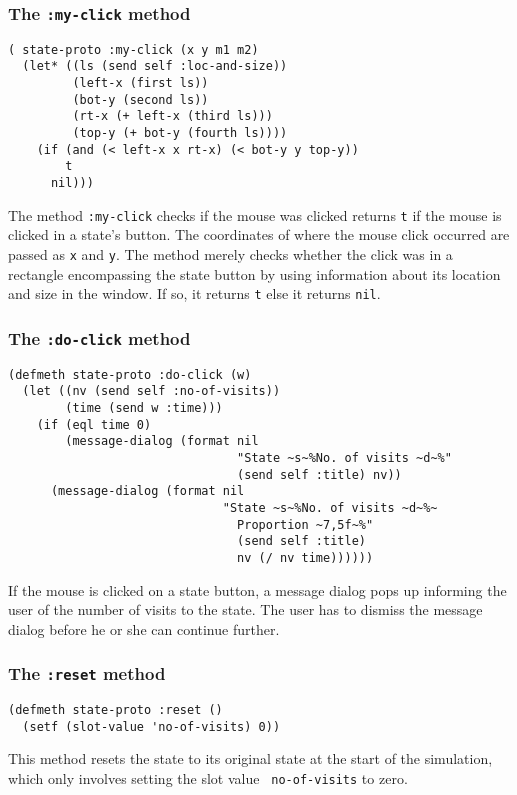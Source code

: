 \subsubsection{The {\tt :my-click} method}
\label{subsubsec:my-click}
\begin{verbatim}
( state-proto :my-click (x y m1 m2)
  (let* ((ls (send self :loc-and-size))
         (left-x (first ls))
         (bot-y (second ls))
         (rt-x (+ left-x (third ls)))
         (top-y (+ bot-y (fourth ls))))
    (if (and (< left-x x rt-x) (< bot-y y top-y))
        t
      nil)))
\end{verbatim}
The method {\tt :my-click} checks if the mouse was clicked returns
{\tt t} if the mouse is clicked in a state's button.  The coordinates
of where the mouse click occurred are passed as {\tt x} and {\tt y}.
The method merely checks whether the click was in a rectangle
encompassing the state button by using information about its location
and size in the window.  If so, it returns {\tt t} else it returns
{\tt nil}. 


\subsubsection{The {\tt :do-click} method}
\label{subsubsec:states-do-click}
\begin{verbatim}
(defmeth state-proto :do-click (w)
  (let ((nv (send self :no-of-visits))
        (time (send w :time)))
    (if (eql time 0)
        (message-dialog (format nil 
                                "State ~s~%No. of visits ~d~%"
                                (send self :title) nv))
      (message-dialog (format nil 
                              "State ~s~%No. of visits ~d~%~
                                Proportion ~7,5f~%"
                                (send self :title) 
                                nv (/ nv time))))))
\end{verbatim}
If the mouse is clicked on a state button, a message dialog pops up
informing the user of the number of visits to the state. The user has
to dismiss the message dialog before he or she can continue further.

\subsubsection{The {\tt :reset} method}
\label{subsubsec:states-reset}
\begin{verbatim}
(defmeth state-proto :reset ()
  (setf (slot-value 'no-of-visits) 0))
\end{verbatim}
This method resets the state to its original state at the start of the
simulation, which only involves setting the slot value {\tt
  no-of-visits} to zero. 

